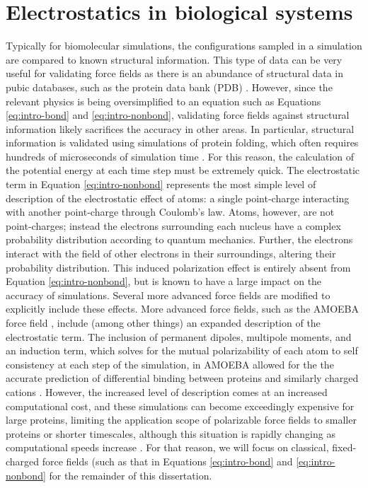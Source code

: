 \section{Electrostatics in biological systems}\label{intro-electrostatic}

Typically for biomolecular simulations, the configurations sampled in a simulation are compared to known structural information.  
This type of data can be very useful for validating force fields as there is an abundance of structural data in pubic databases, such as the protein data bank (PDB) \cite{Berman2000}. 
However, since the relevant physics is being oversimplified to an equation such as Equations \ref{eq:intro-bond} and \ref{eq:intro-nonbond}, validating force fields against structural information likely sacrifices the accuracy in other areas.
In particular, structural information is validated using simulations of protein folding, which often requires hundreds of microseconds of simulation time \cite{Duan1998, Lindorff-Larsen2011, Bowman2011, Voelz2012, Shaw2010, Lane2013, Koukos2014}. 
For this reason, the calculation of the potential energy at each time step must be extremely quick. 
The electrostatic term in Equation \ref{eq:intro-nonbond} represents the most simple level of description of the electrostatic effect of atoms: a single point-charge interacting with another point-charge through Coulomb's law. 
Atoms, however, are not point-charges; instead the electrons surrounding each nucleus have a complex probability distribution according to quantum mechanics.
Further, the electrons interact with the field of other electrons in their surroundings, altering their probability distribution. 
This induced polarization effect is entirely absent from Equation \ref{eq:intro-nonbond}, but is known to have a large impact on the accuracy of simulations. 
Several more advanced force fields are modified to explicitly include these effects. 
More advanced force fields, such as the AMOEBA force field \cite{Shi2013}, include (among other things) an expanded description of the electrostatic term. 
The inclusion of permanent dipoles, multipole moments, and an induction term, which solves for the mutual polarizability of each atom to self consistency at each step of the simulation, in AMOEBA allowed for the the accurate prediction of differential binding between proteins and similarly charged cations \cite{Jing2018}.
However, the increased level of description comes at an increased computational cost, and these simulations can become exceedingly expensive for large proteins, limiting the application scope of polarizable force fields to smaller proteins or shorter timescales, although this situation is rapidly changing as computational speeds increase \cite{Baker2015}. 
For that reason, we will focus on classical, fixed-charged force fields (such as that in Equations \ref{eq:intro-bond} and \ref{eq:intro-nonbond} for the remainder of this dissertation. 

